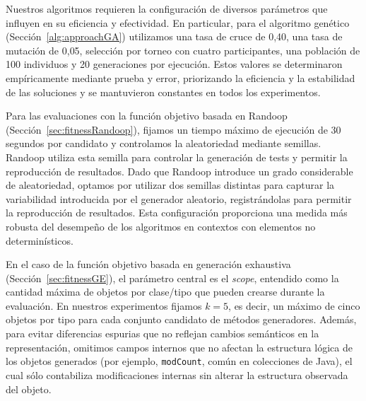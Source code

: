 

Nuestros algoritmos requieren la configuración de diversos parámetros que influyen en su eficiencia y efectividad.
En particular, para el algoritmo genético (Sección~\ref{alg:approachGA}) utilizamos una tasa de cruce de 0{,}40, una tasa de mutación de 0{,}05, 
selección por torneo con cuatro participantes, una población de 100 individuos y 20 generaciones por ejecución. 
Estos valores se determinaron empíricamente mediante prueba y error, priorizando la eficiencia y la estabilidad de las soluciones y se mantuvieron constantes en todos los experimentos.

Para las evaluaciones con la función objetivo basada en Randoop (Sección~\ref{sec:fitnessRandoop}), 
fijamos un tiempo máximo de ejecución de 30 segundos por candidato 
y controlamos la aleatoriedad mediante semillas. Randoop utiliza esta semilla para controlar la generación de tests y
permitir la reproducción de resultados. Dado que Randoop introduce un grado
considerable de aleatoriedad, optamos por utilizar dos semillas distintas para capturar la variabilidad introducida por el 
generador aleatorio, registrándolas para permitir la reproducción de resultados. 
Esta configuración proporciona una medida más robusta del desempeño de los algoritmos en contextos con 
elementos no determin\'isticos.

En el caso de la función objetivo basada en generación exhaustiva (Sección~\ref{sec:fitnessGE}),
el parámetro central es el \emph{scope}, entendido como la cantidad máxima de objetos por clase/tipo que pueden crearse durante la evaluación.
En nuestros experimentos fijamos \(k=5\), es decir, un máximo de cinco objetos por tipo para cada conjunto candidato de métodos generadores. 
Además, para evitar diferencias espurias que no reflejan cambios semánticos en la representación, 
omitimos campos internos que no afectan la estructura lógica de los objetos generados (por ejemplo, \texttt{modCount}, común en colecciones de Java), 
el cual sólo contabiliza modificaciones internas sin alterar la estructura observada del objeto.  

